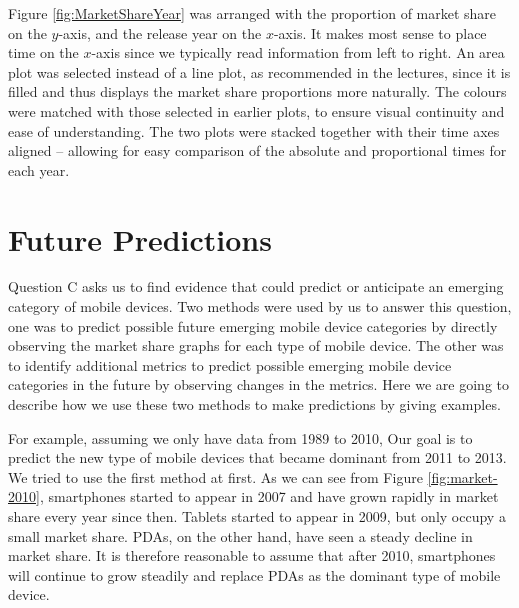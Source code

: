 \documentclass[conference]{IEEEtran}
\begin{document}
Figure \ref{fig:MarketShareYear}
was arranged with the proportion of market share on the $y$-axis, and the release year on the $x$-axis.
It makes most sense to place time on the $x$-axis since we typically read
information from left to right.
An area plot was selected instead of a line plot, as recommended in the lectures,
since it is filled and thus displays the market share proportions more naturally.
The colours were matched with those selected in earlier plots, to ensure visual continuity and ease of understanding.
The two plots were stacked together with their time axes aligned -- allowing for easy comparison of the absolute and proportional times for each year.

\section{Future Predictions}
Question C asks us to find evidence that could predict or anticipate an emerging category of mobile devices. Two methods were used by us to answer this question, one was to predict possible future emerging mobile device categories by directly observing the market share graphs for each type of mobile device. The other was to identify additional metrics to predict possible emerging mobile device categories in the future by observing changes in the metrics. Here we are going to describe how we use these two methods to make predictions by giving examples.

For example, assuming we only have data from 1989 to 2010, Our goal is to predict the new type of mobile devices that became dominant from 2011 to 2013. We tried to use the first method at first. As we can see from Figure \ref{fig:market-2010}, smartphones started to appear in 2007 and have grown rapidly in market share every year since then. Tablets started to appear in 2009, but only occupy a small market share. PDAs, on the other hand, have seen a steady decline in market share. It is therefore reasonable to assume that after 2010, smartphones will continue to grow steadily and replace PDAs as the dominant type of mobile device.
\end{document}
